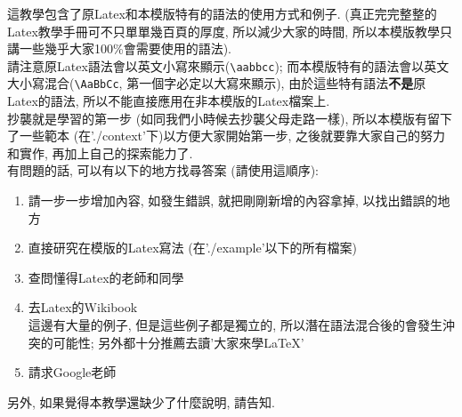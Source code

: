 

這教學包含了原Latex和本模版特有的語法的使用方式和例子. (真正完完整整的Latex教學手冊可不只單單幾百頁的厚度, 所以減少大家的時間, 所以本模版教學只講一些幾乎大家100\%會需要使用的語法).\\

請注意原Latex語法會以英文小寫來顯示(\verb|\aabbcc|); 而本模版特有的語法會以英文大小寫混合(\verb|\AaBbCc|, 第一個字必定以大寫來顯示), 由於這些特有語法\textbf{不是}原Latex的語法, 所以不能直接應用在非本模版的Latex檔案上.\\

抄襲就是學習的第一步 (如同我們小時候去抄襲父母走路一樣), 所以本模版有留下了一些範本 (在'./context'下)以方便大家開始第一步, 之後就要靠大家自己的努力和實作, 再加上自己的探索能力了.\\

有問題的話, 可以有以下的地方找尋答案 (請使用這順序):
\begin{enumerate}
  \item 請一步一步增加內容, 如發生錯誤, 就把剛剛新增的內容拿掉, 以找出錯誤的地方
  \item 直接研究在模版的Latex寫法 (在'./example'以下的所有檔案)
  \item 查問懂得Latex的老師和同學
  \item 去Latex的Wikibook\\
        這邊有大量的例子, 但是這些例子都是獨立的, 所以潛在語法混合後的會發生沖突的可能性; 另外都十分推薦去讀'大家來學LaTeX' 
  \item 請求Google老師
\end{enumerate}

另外, 如果覺得本教學還缺少了什麼說明, 請告知.


\newpage
\newpage
\newpage
\newpage
\newpage
\newpage
\newpage

\EndChapter
